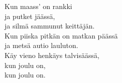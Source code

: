 
            Kun maass' on rankki \\
            ja putket jäässä, \\
            ja silmä sammunut keittäjän. \\
            Kun piiska pitkän on matkan päässä \\
            ja metsä autio lauluton. \\
            Käy vieno henkäys talvisäässä, \\
            kun joulu on, \\
            kun joulu on. \\
